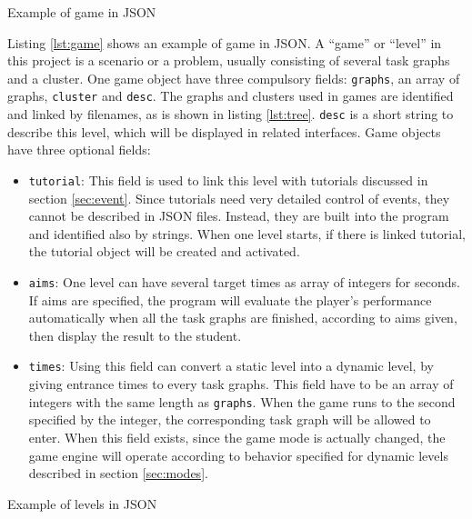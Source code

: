 \documentclass[msc,deptreport, cs]{infthesis}
\begin{document}
\vspace{0.5em}
\begin{lstfloat}
  
  \caption{Example of game in JSON}
  \label{lst:game}
  \vspace{-1em}
\end{lstfloat}
\vspace{-0.5em}

Listing \ref{lst:game} shows an example of game in JSON. A ``game'' or ``level'' in this project is a scenario or a problem, usually consisting of several task graphs and a cluster. One game object have three compulsory fields: \verb+graphs+, an array of graphs, \verb+cluster+ and \verb+desc+. The graphs and clusters used in games are identified and linked by filenames, as is shown in listing \ref{lst:tree}. \verb+desc+ is a short string to describe this level, which will be displayed in related interfaces. Game objects have three optional fields:
\begin{itemize}
  \item \verb+tutorial+: This field is used to link this level with tutorials discussed in section \ref{sec:event}. Since tutorials need very detailed control of events, they cannot be described in JSON files. Instead, they are built into the program and identified also by strings. When one level starts, if there is linked tutorial, the tutorial object will be created and activated.
  \item \verb+aims+: One level can have several target times as array of integers for seconds. If aims are specified, the program will evaluate the player's performance automatically when all the task graphs are finished, according to aims given, then display the result to the student.
  \item \verb+times+: Using this field can convert a static level into a dynamic level, by giving entrance times to every task graphs. This field have to be an array of integers with the same length as \verb+graphs+. When the game runs to the second specified by the integer, the corresponding task graph will be allowed to enter. When this field exists, since the game mode is actually changed, the game engine will operate according to behavior specified for dynamic levels described in section \ref{sec:modes}.
\end{itemize}

\vspace{0.5em}
\begin{lstfloat}
  
  \caption{Example of levels in JSON}
  \label{lst:levels}
  \vspace{-1em}
\end{lstfloat}
\vspace{-0.5em}
\end{document}
